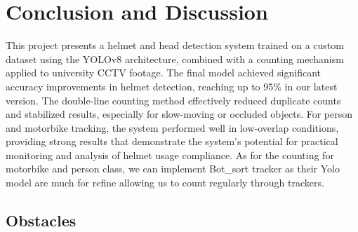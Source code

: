 \chapter{Conclusion and Discussion}
\setlength{\parindent}{2.5em}
This project presents a helmet and head detection system trained on a custom dataset using the YOLOv8 architecture, combined with a counting mechanism applied to university CCTV footage. The final model achieved significant accuracy improvements in helmet detection, reaching up to 95\% in our latest version. The double-line counting method effectively reduced duplicate counts and stabilized results, especially for slow-moving or occluded objects. For person and motorbike tracking, the system performed well in low-overlap conditions, providing strong results that demonstrate the system’s potential for practical monitoring and analysis of helmet usage compliance. As for the counting for motorbike and person class, we can implement Bot\_sort tracker as their Yolo model are much for refine allowing us to count regularly through trackers.

\section{Obstacles}

